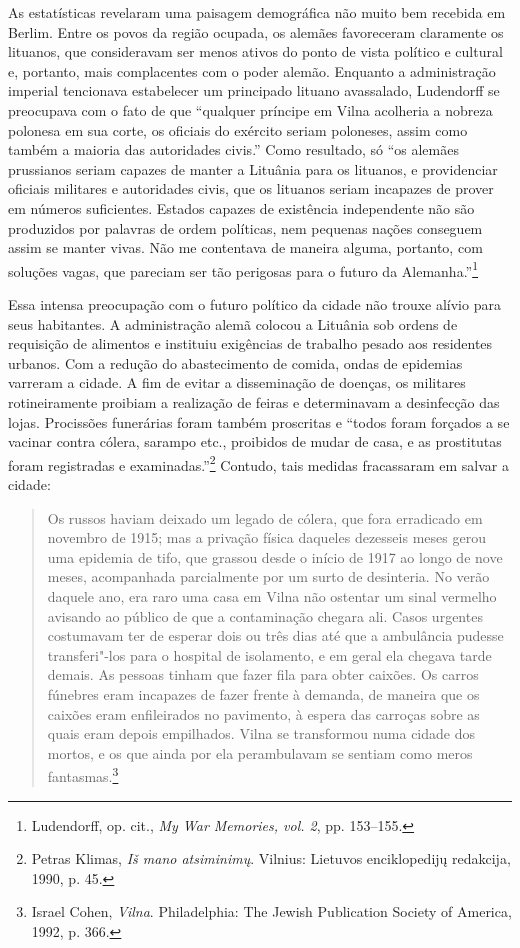 As estatísticas revelaram uma paisagem demográfica não muito bem
recebida em Berlim. Entre os povos da região ocupada, os alemães
favoreceram claramente os lituanos, que consideravam ser menos ativos do
ponto de vista político e cultural e, portanto, mais complacentes com o
poder alemão. Enquanto a administração imperial tencionava estabelecer
um principado lituano avassalado, Ludendorff se preocupava com o fato de
que ``qualquer príncipe em Vilna acolheria a nobreza polonesa em sua
corte, os oficiais do exército seriam poloneses, assim como também a
maioria das autoridades civis.'' Como resultado, só ``os alemães
prussianos seriam capazes de manter a Lituânia para os lituanos, e
providenciar oficiais militares e autoridades civis, que os lituanos
seriam incapazes de prover em números suficientes. Estados capazes de
existência independente não são produzidos por palavras de ordem
políticas, nem pequenas nações conseguem assim se manter vivas. Não me
contentava de maneira alguma, portanto, com soluções vagas, que pareciam
ser tão perigosas para o futuro da Alemanha.''\footnote{Ludendorff, op.
  cit., \emph{My War Memories, vol. 2}, pp. 153--155.}

Essa intensa preocupação com o futuro político da cidade não trouxe
alívio para seus habitantes. A administração alemã colocou a Lituânia
sob ordens de requisição de alimentos e instituiu exigências de trabalho
pesado aos residentes urbanos. Com a redução do abastecimento de comida,
ondas de epidemias varreram a cidade. A fim de evitar a disseminação de
doenças, os militares rotineiramente proibiam a realização de feiras e
determinavam a desinfecção das lojas. Procissões funerárias foram também
proscritas e ``todos foram forçados a se vacinar contra cólera, sarampo
etc., proibidos de mudar de casa, e as prostitutas foram registradas e
examinadas.''\footnote{Petras Klimas, \emph{Iš mano atsiminimų}.
  Vilnius: Lietuvos enciklopedijų redakcija, 1990, p. 45.} Contudo, tais
medidas fracassaram em salvar a cidade:

\begin{quote}
Os russos haviam deixado um legado de cólera, que fora erradicado em
novembro de 1915; mas a privação física daqueles dezesseis meses gerou
uma epidemia de tifo, que grassou desde o início de 1917 ao longo de
nove meses, acompanhada parcialmente por um surto de desinteria. No
verão daquele ano, era raro uma casa em Vilna não ostentar um sinal
vermelho avisando ao público de que a contaminação chegara ali. Casos
urgentes costumavam ter de esperar dois ou três dias até que a
ambulância pudesse transferi"-los para o hospital de isolamento, e em
geral ela chegava tarde demais. As pessoas tinham que fazer fila para
obter caixões. Os carros fúnebres eram incapazes de fazer frente à
demanda, de maneira que os caixões eram enfileirados no pavimento, à
espera das carroças sobre as quais eram depois empilhados. Vilna se
transformou numa cidade dos mortos, e os que ainda por ela perambulavam
se sentiam como meros fantasmas.\footnote{Israel Cohen, \emph{Vilna}.
  Philadelphia: The Jewish Publication Society of America, 1992, p. 366.}
\end{quote}

